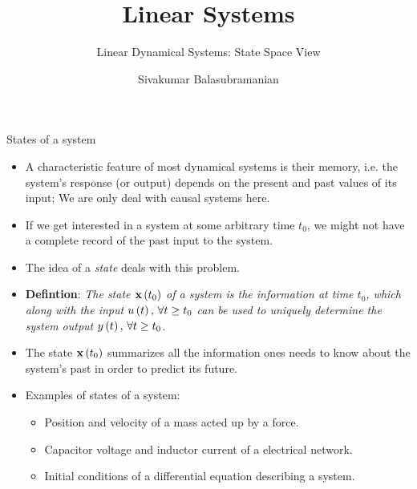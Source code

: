 \documentclass[aspectratio=169]{beamer}
\title{Linear Systems}
\subtitle{Linear Dynamical Systems: State Space View}
\author{Sivakumar Balasubramanian}
\institute[Christian Medical College] %
{
  \inst{}%
  Department of Bioengineering\\
  Christian Medical College, Bagayam\\
  Vellore 632002
}
\date{}
\def\mf{\ensuremath\mathbf}
\def\lp{\ensuremath\left(}
\def\rp{\ensuremath\right)}
\begin{document}

\begin{frame}
  \titlepage
\end{frame}


\begin{frame}{States of a system}
\begin{itemize}
    \item A characteristic feature of most dynamical systems is their memory, i.e. the system's response (or output) depends on the present and past values of its input; We are only deal with causal systems here.

    \item If we get interested in a system at some arbitrary time $t_0$, we might not have a complete record of the past input to the system.

    \item The idea of a \textit{state} deals with this problem. 

    \item \textbf{Defintion}: \textit{The state $\mf{x}\lp t_0\rp$ of a system is the information at time $t_0$, which along with the input $u\lp t\rp,\, \forall t \geq t_0$ can be used to uniquely determine the system output $y\lp t\rp, \, \forall t \geq t_0$.}

    \item The state $\mf{x}\lp t_0\rp$ summarizes all the information ones needs to know about the system's past in order to predict its future.

    \item Examples of states of a system:
    \begin{itemize}
        \item Position and velocity of a mass acted up by a force.
        \item Capacitor voltage and inductor current of a electrical network.
        \item Initial conditions of a differential equation describing a system.
    \end{itemize}
\end{itemize}
\end{frame}
\end{document}
